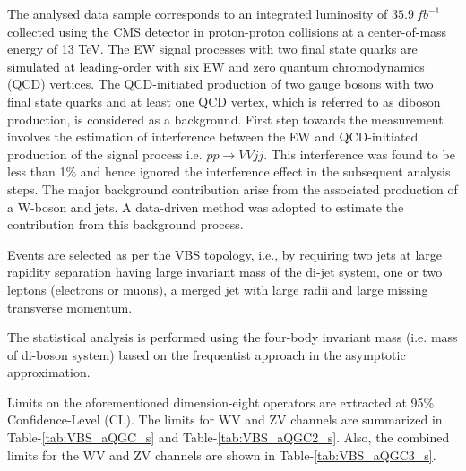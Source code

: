 The analysed data sample corresponds to an integrated luminosity of $35.9~fb^{-1}$ collected using the CMS detector in proton-proton collisions at a center-of-mass energy of 13 TeV. The EW signal processes with two final state quarks are simulated at leading-order with six EW and zero quantum chromodynamics (QCD) vertices. The QCD-initiated production of two gauge bosons with two final state quarks and at least one QCD vertex, which is referred to as diboson production, is considered as a background. First step towards the measurement involves the estimation of interference between the EW and QCD-initiated production of the signal process i.e. $pp \rightarrow VV jj$. This interference was found to be less than 1\% and hence ignored the interference effect in the subsequent analysis steps.
The major background contribution arise from the associated production of a W-boson and jets. A data-driven method was adopted to estimate the contribution from this background process.

Events are selected as per the VBS topology, i.e., by requiring two jets at large rapidity separation having large invariant mass of the di-jet system, one or two leptons (electrons or muons), a merged jet with large radii and large missing transverse momentum.

The statistical analysis is performed using the four-body invariant mass (i.e. mass of di-boson system) based on the frequentist approach in the asymptotic approximation.

Limits on the aforementioned dimension-eight operators are extracted at 95\% Confidence-Level (CL). The limits for WV and ZV channels are summarized in Table-\ref{tab:VBS_aQGC_s} and Table-\ref{tab:VBS_aQGC2_s}. Also, the combined limits for the WV and ZV channels are shown in Table-\ref{tab:VBS_aQGC3_s}.



